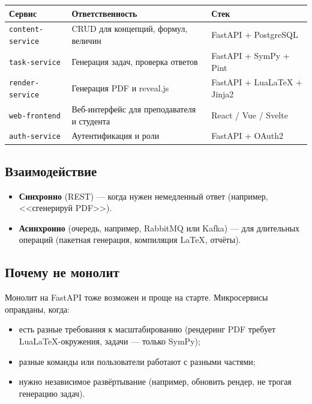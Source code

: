 \documentclass[12pt,a4paper]{article}
\newcommand{\code}[1]{\texttt{#1}}
\begin{document}
\begin{center}
\begin{tabular}{@{}p{3.5cm}p{6cm}p{4cm}@{}}
\toprule
\textbf{Сервис} & \textbf{Ответственность} & \textbf{Стек} \\
\midrule
\code{content-service} & CRUD для концепций, формул, величин & FastAPI + PostgreSQL \\
\code{task-service} & Генерация задач, проверка ответов & FastAPI + SymPy + Pint \\
\code{render-service} & Генерация PDF и reveal.js & FastAPI + LuaLaTeX + Jinja2 \\
\code{web-frontend} & Веб-интерфейс для преподавателя и студента & React / Vue / Svelte \\
\code{auth-service} & Аутентификация и роли & FastAPI + OAuth2 \\
\bottomrule
\end{tabular}
\end{center}

\subsection{Взаимодействие}

\begin{itemize}
    \item \textbf{Синхронно} (REST) --- когда нужен немедленный ответ
          (например, <<сгенерируй PDF>>).
    \item \textbf{Асинхронно} (очередь, например, RabbitMQ или Kafka) ---
          для длительных операций (пакетная генерация, компиляция
          LaTeX, отчёты).
\end{itemize}

\subsection{Почему не монолит}

Монолит на FastAPI тоже возможен и проще на старте. Микросервисы
оправданы, когда:
\begin{itemize}
    \item есть разные требования к масштабированию (рендеринг
          PDF требует LuaLaTeX-окружения, задачи --- только SymPy);
    \item разные команды или пользователи работают с разными частями;
    \item нужно независимое развёртывание (например, обновить
          рендер, не трогая генерацию задач).
\end{itemize}
\end{document}
